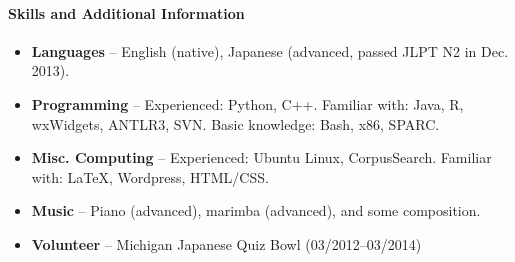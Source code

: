 \documentclass[10pt,oneside]{article}
\newenvironment{ressection}[1]{
	\paragraph{\Large#1}
	\begin{itemize}
}{
	\end{itemize}
}
\begin{document}
\begin{ressection}{Skills and Additional Information}
	\item{\textbf{Languages} -- English (native), Japanese (advanced, passed JLPT N2 in Dec. 2013).}
    
    \item{\textbf{Programming} -- Experienced: Python, C++. Familiar with: Java, R, wxWidgets, ANTLR3, SVN. Basic knowledge: Bash, x86, SPARC.}
    
    \item{\textbf{Misc. Computing} -- Experienced: Ubuntu Linux, CorpusSearch. Familiar with: \LaTeX{}, Wordpress, HTML/CSS.}
    
    \item{\textbf{Music} --  Piano (advanced), marimba (advanced), and some composition.}
    
    \item{\textbf{Volunteer} -- Michigan Japanese Quiz Bowl (03/2012--03/2014)}
\end{ressection}
\end{document}
